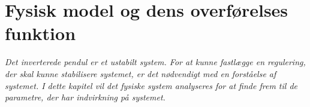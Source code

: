 \chapter{Fysisk model og dens overførelses funktion}\label{kap:chap_fysik_reg}

\emph{Det inverterede pendul er et ustabilt system. For at kunne fastlægge en regulering, der skal kunne stabilisere systemet, er det nødvendigt med en forståelse af systemet. I dette kapitel vil det fysiske system analyseres for at finde frem til de parametre, der har indvirkning på systemet.}

